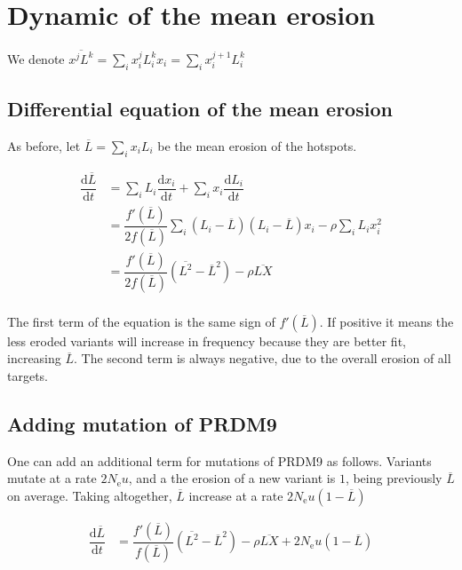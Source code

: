 \documentclass{article}
\begin{document}
\section{Dynamic of the mean erosion}
We denote $\overline{x^{j} L^{k}}=\sum_i x_i^{j} L_i^{k} x_i =\sum_i x_i^{j+1} L_i^{k}$

\subsection{Differential equation of the mean erosion}
As before, let $\overline{L}=\sum_i x_i L_i$ be the mean erosion of the hotspots.

\begin{equation}
  \begin{aligned}
    \dfrac{\mathrm{d} \overline{L} }{\mathrm{d}t} &=
    \sum_i L_i \dfrac{\mathrm{d}x_i}{\mathrm{d}t} +  \sum_i x_i \dfrac{\mathrm{d}L_i}{\mathrm{d}t} \\
    &=
    \dfrac{f'(\overline{L})}{2 f(\overline{L})} \sum_i (L_i - \overline{L}) (L_i - \overline{L}) x_i - \rho \sum_i L_i x_i^2\\
    &=
    \dfrac{f'(\overline{L})}{2 f(\overline{L})} (\overline{L^2} - \overline{L}^2) - \rho \overline{L X}\\
  \end{aligned}
\end{equation}

The first term of the equation is the same sign of $f'(\overline{L})$. If positive it means the less eroded variants will increase in frequency because they are better fit, increasing $\overline{L}$. The second term is always negative, due to the overall erosion of all targets.

\subsection{Adding mutation of PRDM9}

One can add an additional term for mutations of PRDM9 as follows. Variants mutate at a rate $2 N_\mathrm{e} u$, and a the erosion of a new variant is $1$, being previously $\overline{L}$ on average. Taking altogether, $\overline{L}$ increase at a rate  $2 N_\mathrm{e} u (1 - \overline{L})$

\begin{equation}
  \begin{aligned}
    \dfrac{\mathrm{d} \overline{L} }{\mathrm{d}t} &=
    \dfrac{f'(\overline{L})}{f(\overline{L})} (\overline{L^2} - \overline{L}^2) - \rho \overline{L X} + 2 N_\mathrm{e} u (1 - \overline{L})\\
  \end{aligned}
\end{equation}
\end{document}
